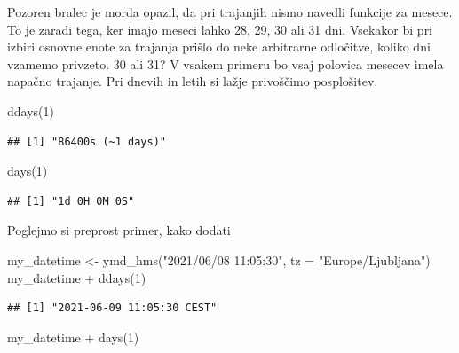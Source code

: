 \documentclass[
]{book}
\newenvironment{Shaded}{\begin{snugshade}}{\end{snugshade}}
\newcommand{\AttributeTok}[1]{\textcolor[rgb]{0.77,0.63,0.00}{#1}}
\newcommand{\DecValTok}[1]{\textcolor[rgb]{0.00,0.00,0.81}{#1}}
\newcommand{\FunctionTok}[1]{\textcolor[rgb]{0.00,0.00,0.00}{#1}}
\newcommand{\NormalTok}[1]{#1}
\newcommand{\OtherTok}[1]{\textcolor[rgb]{0.56,0.35,0.01}{#1}}
\newcommand{\SpecialCharTok}[1]{\textcolor[rgb]{0.00,0.00,0.00}{#1}}
\newcommand{\StringTok}[1]{\textcolor[rgb]{0.31,0.60,0.02}{#1}}
\begin{document}
Pozoren bralec je morda opazil, da pri trajanjih nismo navedli funkcije za mesece. To je zaradi tega, ker imajo meseci lahko 28, 29, 30 ali 31 dni. Vsekakor bi pri izbiri osnovne enote za trajanja prišlo do neke arbitrarne odločitve, koliko dni vzamemo privzeto. 30 ali 31? V vsakem primeru bo vsaj polovica mesecev imela napačno trajanje. Pri dnevih in letih si lažje privoščimo posplošitev.

\begin{Shaded}
\begin{Highlighting}[]
\FunctionTok{ddays}\NormalTok{(}\DecValTok{1}\NormalTok{)}
\end{Highlighting}
\end{Shaded}

\begin{verbatim}
## [1] "86400s (~1 days)"
\end{verbatim}

\begin{Shaded}
\begin{Highlighting}[]
\FunctionTok{days}\NormalTok{(}\DecValTok{1}\NormalTok{)}
\end{Highlighting}
\end{Shaded}

\begin{verbatim}
## [1] "1d 0H 0M 0S"
\end{verbatim}

Poglejmo si preprost primer, kako dodati

\begin{Shaded}
\begin{Highlighting}[]
\NormalTok{my\_datetime }\OtherTok{\textless{}{-}} \FunctionTok{ymd\_hms}\NormalTok{(}\StringTok{"2021/06/08 11:05:30"}\NormalTok{, }\AttributeTok{tz =} \StringTok{"Europe/Ljubljana"}\NormalTok{)}
\NormalTok{my\_datetime }\SpecialCharTok{+} \FunctionTok{ddays}\NormalTok{(}\DecValTok{1}\NormalTok{)}
\end{Highlighting}
\end{Shaded}

\begin{verbatim}
## [1] "2021-06-09 11:05:30 CEST"
\end{verbatim}

\begin{Shaded}
\begin{Highlighting}[]
\NormalTok{my\_datetime }\SpecialCharTok{+} \FunctionTok{days}\NormalTok{(}\DecValTok{1}\NormalTok{)}
\end{Highlighting}
\end{Shaded}
\end{document}
